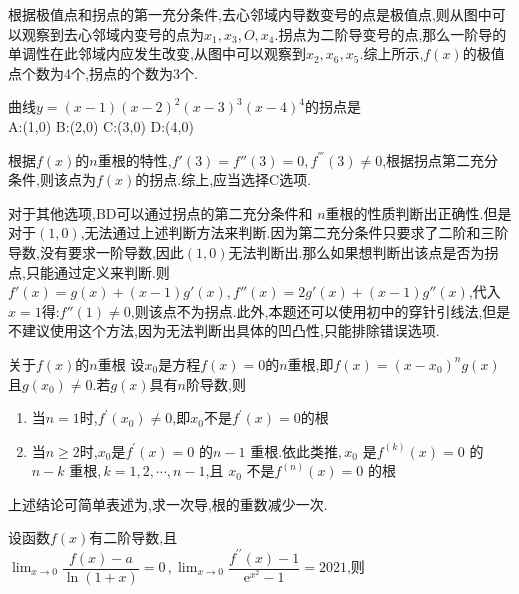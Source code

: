 \documentclass[8pt a4paper, oneside, UTF8]{ctexbook}  %
\begin{document}
\begin{sloppypar}
\begin{problem}
\begin{center}
    \end{center}
    \end{problem}
    \begin{solution}
        根据极值点和拐点的第一充分条件,去心邻域内导数变号的点是极值点,则从图中可以观察到去心邻域内变号的点为$x_1,x_3,O,x_4$.拐点为二阶导变号的点,那么一阶导的单调性在此邻域内应发生改变,从图中可以观察到$x_2,x_6,x_5$.综上所示,$f(x)$的极值点个数为4个,拐点的个数为3个.
    \end{solution}
    \begin{problem}
    曲线$y=(x-1)(x-2)^2(x-3)^3(x-4)^4$的拐点是\\
    A:(1,0) \quad B:(2,0) \quad C:(3,0) \quad D:(4,0)
    \end{problem}
    \begin{solution}
        根据$f(x)$的$n$重根的特性,$f'(3)=f''(3)=0,f^{'''}(3)\neq0$,根据拐点第二充分条件,则该点为$f(x)$的拐点.综上,应当选择C选项.
    \end{solution}
    \begin{note}
        对于其他选项,BD可以通过拐点的第二充分条件和 $n$重根的性质判断出正确性.但是对于$(1,0)$,无法通过上述判断方法来判断.因为第二充分条件只要求了二阶和三阶导数,没有要求一阶导数,因此$(1,0)$无法判断出.那么如果想判断出该点是否为拐点,只能通过定义来判断.则$f'(x)=g(x)+(x-1)g'(x),f''(x)=2g'(x)+(x-1)g''(x)$,代入$x=1$得:$f''(1)\neq0$,则该点不为拐点.此外,本题还可以使用初中的穿针引线法,但是不建议使用这个方法,因为无法判断出具体的凹凸性,只能排除错误选项.
    \end{note}
    \begin{conclusion}{关于$f(x)$的$n$重根}{}
        设$x_0$是方程$f(x)=0$的$n$重根,即$f(x)=(x-x_0)^ng(x)$且$g(x_0)\neq0.$若$g(x)$具有$n$阶导数,则
        \begin{enumerate}
            \item 当$n=1$时,$f^\prime(x_0)\neq0$,即$x_0$不是$f^\prime(x)=0$的根
            \item 当$n\geqslant2$时,$x_0$是$f^\prime(x)=0$ 的$n-1$ 重根.依此类推$,x_0$ 是$f^{(k)}(x)=0$ 的$n-k$ 重根$,k=1,2,\cdots,n-1$,且 $x_0$ 不是$f^{(n)}(x)=0$ 的根
        \end{enumerate}
        上述结论可简单表述为,求一次导,根的重数减少一次.
    \end{conclusion}
    \begin{problem}
    设函数$f(x)$有二阶导数,且$\operatorname*{lim}_{x\to0}\dfrac{f(x)-a}{\operatorname{ln}(1+x)}=0\,,\operatorname*{lim}_{x\to0}\dfrac{f^{\prime\prime}(x)-1}{\mathrm{e}^{x^{2}}-1}=2021$,则\\

\end{problem}
\end{sloppypar}
\end{document}
